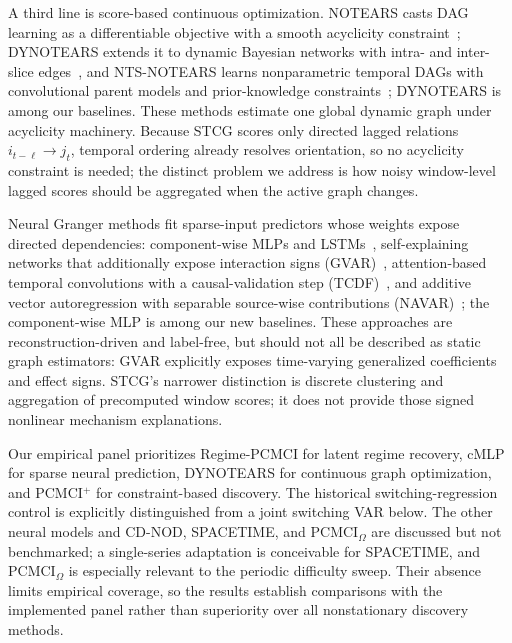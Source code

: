 \documentclass[sigconf,anonymous]{acmart}
\begin{document}
A third line is score-based continuous optimization.
NOTEARS casts DAG learning as a differentiable objective with a smooth acyclicity constraint~\cite{zheng2018dags}; DYNOTEARS extends it to dynamic Bayesian networks with intra- and inter-slice edges~\cite{pamfil2020dynotears}, and NTS-NOTEARS learns nonparametric temporal DAGs with convolutional parent models and prior-knowledge constraints~\cite{sun2023ntsnotears}; DYNOTEARS is among our baselines.
These methods estimate one global dynamic graph under acyclicity machinery.
Because STCG scores only directed lagged relations $i_{t-\ell}\rightarrow j_t$, temporal ordering already resolves orientation, so no acyclicity constraint is needed; the distinct problem we address is how noisy window-level lagged scores should be aggregated when the active graph changes.

Neural Granger methods fit sparse-input predictors whose weights expose directed dependencies: component-wise MLPs and LSTMs~\cite{tank2021neural}, self-explaining networks that additionally expose interaction signs (GVAR)~\cite{marcinkevics2021gvar}, attention-based temporal convolutions with a causal-validation step (TCDF)~\cite{nauta2019tcdf}, and additive vector autoregression with separable source-wise contributions (NAVAR)~\cite{bussmann2021navar}; the component-wise MLP is among our new baselines.
These approaches are reconstruction-driven and label-free, but should not all be described as static graph estimators: GVAR explicitly exposes time-varying generalized coefficients and effect signs.
STCG's narrower distinction is discrete clustering and aggregation of precomputed window scores; it does not provide those signed nonlinear mechanism explanations.

Our empirical panel prioritizes Regime-PCMCI for latent regime recovery, cMLP for sparse neural prediction, DYNOTEARS for continuous graph optimization, and PCMCI$^+$ for constraint-based discovery. The historical switching-regression control is explicitly distinguished from a joint switching VAR below.
The other neural models and CD-NOD, SPACETIME, and PCMCI$_\Omega$ are discussed but not benchmarked; a single-series adaptation is conceivable for SPACETIME, and PCMCI$_\Omega$ is especially relevant to the periodic difficulty sweep.
Their absence limits empirical coverage, so the results establish comparisons with the implemented panel rather than superiority over all nonstationary discovery methods.
\end{document}
